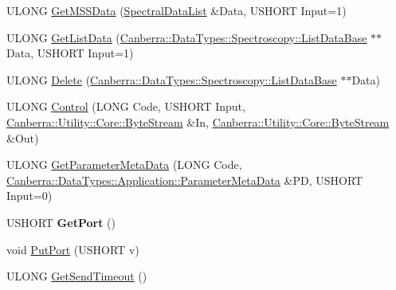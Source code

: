 \begin{DoxyCompactItemize}
\item 
U\+L\+O\+NG \hyperlink{class_canberra_1_1_protocols_1_1_lynx_1_1_device_a49215c7186fc99e486ec514488dad437_a49215c7186fc99e486ec514488dad437}{Get\+M\+S\+S\+Data} (\hyperlink{class_canberra_1_1_protocols_1_1_lynx_1_1_spectral_data_list}{Spectral\+Data\+List} \&Data, U\+S\+H\+O\+RT Input=1)
\item 
U\+L\+O\+NG \hyperlink{class_canberra_1_1_protocols_1_1_lynx_1_1_device_a7af58e6c130e27da33a02e46eddd0bab_a7af58e6c130e27da33a02e46eddd0bab}{Get\+List\+Data} (\hyperlink{class_canberra_1_1_data_types_1_1_spectroscopy_1_1_list_data_base}{Canberra\+::\+Data\+Types\+::\+Spectroscopy\+::\+List\+Data\+Base} $\ast$$\ast$Data, U\+S\+H\+O\+RT Input=1)
\item 
U\+L\+O\+NG \hyperlink{class_canberra_1_1_protocols_1_1_lynx_1_1_device_a16877dd4491fee82dcd4708cee09a43f_a16877dd4491fee82dcd4708cee09a43f}{Delete} (\hyperlink{class_canberra_1_1_data_types_1_1_spectroscopy_1_1_list_data_base}{Canberra\+::\+Data\+Types\+::\+Spectroscopy\+::\+List\+Data\+Base} $\ast$$\ast$Data)
\item 
U\+L\+O\+NG \hyperlink{class_canberra_1_1_protocols_1_1_lynx_1_1_device_a0dbc14914d271155daf5270dde6a4809_a0dbc14914d271155daf5270dde6a4809}{Control} (L\+O\+NG Code, U\+S\+H\+O\+RT Input, \hyperlink{class_canberra_1_1_utility_1_1_core_1_1_byte_stream}{Canberra\+::\+Utility\+::\+Core\+::\+Byte\+Stream} \&In, \hyperlink{class_canberra_1_1_utility_1_1_core_1_1_byte_stream}{Canberra\+::\+Utility\+::\+Core\+::\+Byte\+Stream} \&Out)
\item 
U\+L\+O\+NG \hyperlink{class_canberra_1_1_protocols_1_1_lynx_1_1_device_ad3cbed9925aa49688846a18e8eedfbd1_ad3cbed9925aa49688846a18e8eedfbd1}{Get\+Parameter\+Meta\+Data} (L\+O\+NG Code, \hyperlink{class_canberra_1_1_data_types_1_1_application_1_1_parameter_meta_data}{Canberra\+::\+Data\+Types\+::\+Application\+::\+Parameter\+Meta\+Data} \&PD, U\+S\+H\+O\+RT Input=0)
\item 
\mbox{\label{class_canberra_1_1_protocols_1_1_lynx_1_1_device_af8ea16cc9570a2d7eab9abb2102cf6c4}} 
U\+S\+H\+O\+RT {\bfseries Get\+Port} ()
\item 
void \hyperlink{class_canberra_1_1_protocols_1_1_lynx_1_1_device_a28e7caa3973967170dbc445771644193_a28e7caa3973967170dbc445771644193}{Put\+Port} (U\+S\+H\+O\+RT v)
\item 
U\+L\+O\+NG \hyperlink{class_canberra_1_1_protocols_1_1_lynx_1_1_device_a2db7c8288c3316f23f29bea4948634c4_a2db7c8288c3316f23f29bea4948634c4}{Get\+Send\+Timeout} ()

\end{DoxyCompactItemize}
